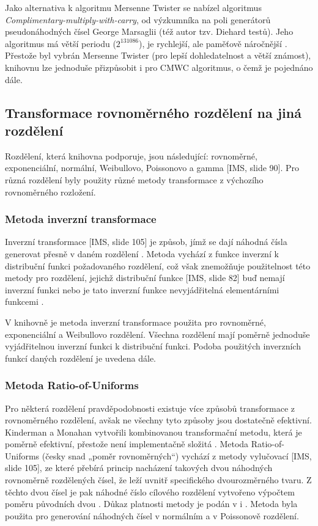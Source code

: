 \documentclass[a4paper,11pt]{article}
\begin{document}
Jako alternativa k algoritmu Mersenne Twister se nabízel algoritmus \emph{Complimentary-multiply-with-carry}, od výzkumníka na poli generátorů pseudonáhodných čísel George Marsaglii (též autor tzv. Diehard testů). Jeho algoritmus má větší periodu ($2^{131086}$), je rychlejší, ale paměťově náročnější \cite{jomasm}. Přestože byl vybrán Mersenne Twister (pro lepší dohledatelnost a větší známost), knihovnu lze jednoduše přizpůsobit i pro CMWC algoritmus, o čemž je pojednáno dále.

\subsection{Transformace rovnoměrného rozdělení na jiná rozdělení}
Rozdělení, která knihovna podporuje, jsou následující: rovnoměrné, exponenciální, normální, Weibullovo, Poissonovo a  gamma [IMS, slide 90]. Pro různá rozdělení byly použity různé metody transformace z výchozího rovnoměrného rozložení.

\subsubsection{Metoda inverzní transformace}
Inverzní transformace [IMS, slide 105] je způsob, jímž se dají náhodná čísla generovat přesně v daném rozdělení \cite{IMS2}. Metoda vychází z funkce inverzní k distribuční funkci požadovaného rozdělení, což však znemožňuje použitelnost této metody pro rozdělení, jejichž distribuční funkce [IMS, slide 82] buď nemají inverzní funkci nebo je tato inverzní funkce nevyjádřitelná elementárními funkcemi \cite{IMS2}.

V knihovně je metoda inverzní transformace použita pro rovnoměrné, exponenciální a Weibullovo rozdělení. Všechna rozdělení mají poměrně jednoduše vyjádřitelnou inverzní funkci k distribuční funkci. Podoba použitých inverzních funkcí daných rozdělení je uvedena dále.

\subsubsection{Metoda Ratio-of-Uniforms}
Pro některá rozdělení pravděpodobnosti existuje více způsobů transformace z rovnoměrného rozdělení, avšak ne všechny tyto způsoby jsou dostatečně efektivní. Kinderman a Monahan vytvořili kombinovanou transformační metodu, která je poměrně efektivní, přestože není implementačně složitá \cite{KM}. Metoda Ratio-of-Uniforms (česky snad „poměr rovnoměrných“) vychází z metody vylučovací [IMS, slide 105], ze které přebírá princip nacházení takových dvou náhodných rovnoměrně rozdělených čísel, že leží uvnitř specifického dvourozměrného tvaru. Z těchto dvou čísel je pak náhodné číslo cílového rozdělení vytvořeno výpočtem poměru původních dvou \cite{NR}. Důkaz platnosti metody je podán v \cite{KM} i \cite{NR}. Metoda byla použita pro generování náhodných čísel v normálním a v Poissonově rozdělení.
\end{document}
